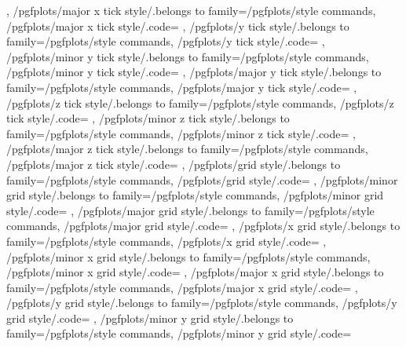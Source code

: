 {{	},
	/pgfplots/major x tick style/.belongs to family=/pgfplots/style commands,
	/pgfplots/major x tick style/.code={%
	},
	/pgfplots/y tick style/.belongs to family=/pgfplots/style commands,
	/pgfplots/y tick style/.code={%
	},
	/pgfplots/minor y tick style/.belongs to family=/pgfplots/style commands,
	/pgfplots/minor y tick style/.code={%
	},
	/pgfplots/major y tick style/.belongs to family=/pgfplots/style commands,
	/pgfplots/major y tick style/.code={%
	},
	/pgfplots/z tick style/.belongs to family=/pgfplots/style commands,
	/pgfplots/z tick style/.code={%
	},
	/pgfplots/minor z tick style/.belongs to family=/pgfplots/style commands,
	/pgfplots/minor z tick style/.code={%
	},
	/pgfplots/major z tick style/.belongs to family=/pgfplots/style commands,
	/pgfplots/major z tick style/.code={%
	},
	/pgfplots/grid style/.belongs to family=/pgfplots/style commands,
	/pgfplots/grid style/.code={%
	},
	/pgfplots/minor grid style/.belongs to family=/pgfplots/style commands,
	/pgfplots/minor grid style/.code={%
	},
	/pgfplots/major grid style/.belongs to family=/pgfplots/style commands,
	/pgfplots/major grid style/.code={%
	},
	/pgfplots/x grid style/.belongs to family=/pgfplots/style commands,
	/pgfplots/x grid style/.code={%
	},
	/pgfplots/minor x grid style/.belongs to family=/pgfplots/style commands,
	/pgfplots/minor x grid style/.code={%
	},
	/pgfplots/major x grid style/.belongs to family=/pgfplots/style commands,
	/pgfplots/major x grid style/.code={%
	},
	/pgfplots/y grid style/.belongs to family=/pgfplots/style commands,
	/pgfplots/y grid style/.code={%
	},
	/pgfplots/minor y grid style/.belongs to family=/pgfplots/style commands,
	/pgfplots/minor y grid style/.code={%
}}
